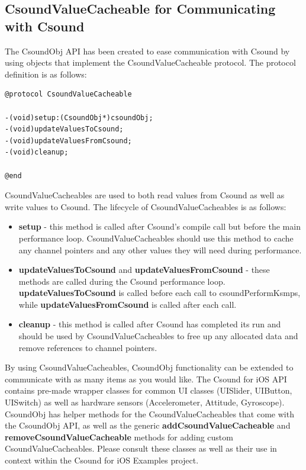 \documentclass[11pt]{article}
\begin{document}
\subsection{CsoundValueCacheable for Communicating with Csound}

The CsoundObj API has been created to ease communication with Csound by using objects that implement the CsoundValueCacheable protocol.  The protocol definition is as follows:

\begin{lstlisting}[caption=CsoundValueCacheable Protocol Definition]
@protocol CsoundValueCacheable

-(void)setup:(CsoundObj*)csoundObj;
-(void)updateValuesToCsound;
-(void)updateValuesFromCsound;
-(void)cleanup;

@end
\end{lstlisting}

CsoundValueCacheables are used to both read values from Csound as well as write values to Csound.  The lifecycle of CsoundValueCacheables is as follows:

\begin{itemize}
\item \textbf{setup} - this method is called after Csound's compile call but before the main performance loop. CsoundValueCacheables should use this method to cache any channel pointers and any other values they will need during performance.
\item \textbf{updateValuesToCsound} and \textbf{updateValuesFromCsound} - these methods are called during the Csound performance loop. \textbf{updateValuesToCsound} is called before each call to csoundPerformKsmps, while \textbf{updateValuesFromCsound} is called after each call. 
\item \textbf{cleanup} - this method is called after Csound has completed its run and should be used by CsoundValueCacheables to free up any allocated data and remove references to channel pointers.
\end{itemize}

By using CsoundValueCacheables, CsoundObj functionality can be extended to communicate with as many items as you would like. The Csound for iOS API contains pre-made wrapper classes for common UI classes (UISlider, UIButton, UISwitch) as well as hardware sensors (Accelerometer, Attitude, Gyroscope).  CsoundObj has helper methods for the CsoundValueCacheables that come with the CsoundObj API, as well as the generic \textbf{addCsoundValueCacheable} and \textbf{removeCsoundValueCacheable} methods for adding custom CsoundValueCacheables. Please consult these classes as well as their use in context within the Csound for iOS Examples project.
\end{document}

